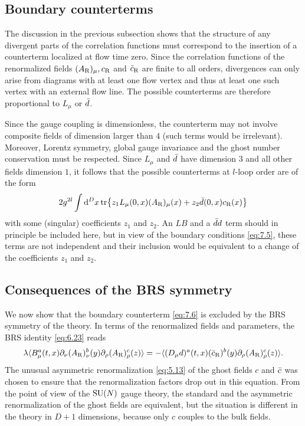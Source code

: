\subsection{Boundary counterterms}

The discussion in the previous
subsection shows that the structure of any divergent
parts of the correlation functions
must correspond to the insertion
of a counterterm localized at flow time zero.
Since the correlation functions of the renormalized fields
$(A_{\mathrm{R}})_{\mu},c_{\mathrm{R}}$ and $\bar{c}_{\mathrm{R}}$
are finite to all orders, divergences can only
arise from diagrams with at least one flow vertex
and thus at least one such vertex with an external flow line.
The possible counterterms are therefore proportional to
$L_{\mu}$ or $\bar{d}$.

Since the gauge coupling is dimensionless,
the counterterm
may not involve composite fields of dimension larger than $4$
(such terms would be irrelevant). Moreover, Lorentz symmetry,
global gauge invariance and the ghost number conservation
must be respected.
Since $L_{\mu}$ and $\bar{d}$ have dimension $3$
and all other fields dimension $1$, it follows that
the possible counterterms at $l$-loop order are of the form
\begin{equation}
   2g^{2l}\int\mathrm{d}^Dx\,\mathrm{tr}\bigl\{
   z_1L_{\mu}(0,x)(A_{\mathrm{R}})_{\mu}(x)+
   z_2\bar{d}(0,x)c_{\mathrm{R}}(x)\bigr\}
   \label{eq:7.6}
\end{equation}
with some (singular) coefficients $z_1$ and $z_2$.
An $LB$ and a $\bar{d} d$ term should in principle be
included here, but in view of the boundary conditions \eqref{eq:7.5},
these terms are not independent and their inclusion
would be equivalent to a change of
the coefficients $z_1$ and $z_2$.

\subsection{Consequences of the BRS symmetry}

We now show that the boundary counterterm \eqref{eq:7.6} is excluded
by the BRS symmetry of the theory.
In terms of the renormalized fields and parameters, the
BRS identity \eqref{eq:6.23} reads
\begin{equation}
   \lambda\langle
   B^a_{\mu}(t,x)\partial_{\nu}(A_{\mathrm{R}})^b_{\nu}(y)
   \partial_{\rho}(A_{\mathrm{R}})^c_{\rho}(z)
   \rangle=
   -\langle(D_{\mu}d)^a(t,x)
   (\bar{c}_{\mathrm{R}})^b(y)\partial_{\rho}(A_{\mathrm{R}})^c_{\rho}(z)\rangle.
   \label{eq:7.7}
\end{equation}
The unusual asymmetric renormalization \eqref{eq:5.13} of the ghost fields
$c$ and $\bar{c}$ was chosen to ensure that the renormalization factors
drop out in this equation. From the point of view of the
$\mathrm{SU}(N)$ gauge theory, the standard and
the asymmetric renormalization of the ghost fields are equivalent,
but the situation
is different in the theory in $D+1$ dimensions, because only $c$ couples
to the bulk fields.

